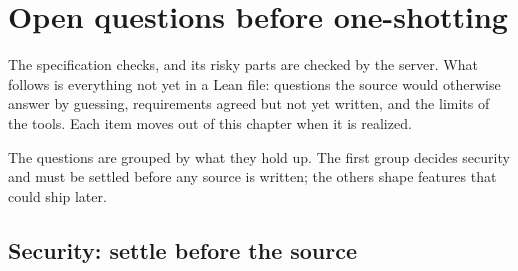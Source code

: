 \chapter{Open questions before one-shotting}
The specification checks, and its risky parts are checked by the server. What
follows is everything not yet in a Lean file: questions the source would
otherwise answer by guessing, requirements agreed but not yet written, and the
limits of the tools. Each item moves out of this chapter when it is realized.

The questions are grouped by what they hold up. The first group decides security
and must be settled before any source is written; the others shape features
that could ship later.

\section{Security: settle before the source}
